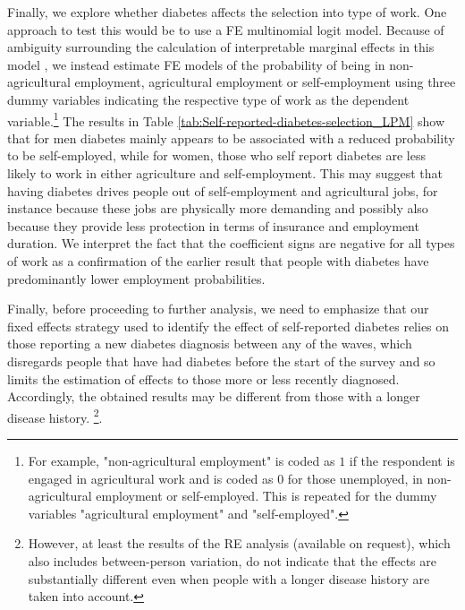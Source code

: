 \documentclass[12pt,english,british]{article}
\begin{document}
Finally, we explore whether diabetes affects the selection into type of work. One approach to test this would be to use a \ac{FE} multinomial logit model. Because of ambiguity surrounding the calculation of interpretable marginal effects in this model \citep{Pforr2014}, we instead estimate \ac{FE} models of the probability of being in non-agricultural employment, agricultural employment or self-employment using three dummy variables indicating the respective type of work as the dependent variable.\footnote{For example, "non-agricultural employment" is coded as $1$ if the respondent is engaged in agricultural work and is coded as $0$ for those unemployed, in non-agricultural employment or self-employed. This is repeated for the dummy variables "agricultural employment" and "self-employed".} The results in Table \ref{tab:Self-reported-diabetes-selection_LPM} show that for men diabetes mainly appears to be associated with a reduced probability to be self-employed, while for women, those who self report diabetes are less likely to work in either agriculture and self-employment. This may suggest that having diabetes drives people out of self-employment and agricultural jobs, for instance because these jobs are physically more demanding and possibly also because they provide less protection in terms of insurance and employment duration. We interpret the fact that the coefficient signs are negative for all types of work as a confirmation of the earlier result that people with diabetes have predominantly lower employment probabilities.

Finally, before proceeding to further analysis, we need to emphasize that our fixed effects strategy used to identify the effect of self-reported diabetes relies on those reporting a new diabetes diagnosis between any of the waves, which disregards people that have had diabetes before the start of the survey and so limits the estimation of effects to those more or less recently diagnosed. Accordingly, the obtained results may be different from those with a longer disease history. \footnote{However, at least the results of the \ac{RE} analysis (available on request), which also includes between-person variation, do not indicate that the effects are substantially different even when people with a longer disease history are taken into account.}. 
\end{document}
